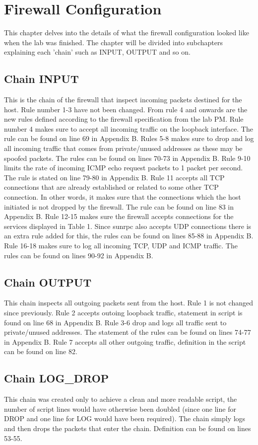 \section{Firewall Configuration}
\label{sec:config}
This chapter delves into the details of what the firewall configuration looked like when the lab was finished. The chapter will be divided into subchapters explaining each 'chain' such as INPUT, OUTPUT and so on.

\subsection{Chain INPUT}
This is the chain of the firewall that inspect incoming packets destined for the host. Rule number 1-3 have not been changed. From rule 4 and onwards are the new rules defined according to the firewall specification from the lab PM. Rule number 4 makes sure to accept all incoming traffic on the loopback interface. The rule can be found on line 69 in Appendix B. Rules 5-8 makes sure to drop and log all incoming traffic that comes from private/unused addresses as these may be spoofed packets. The rules can be found on lines 70-73 in Appendix B. Rule 9-10 limits the rate of incoming ICMP echo request packets to 1 packet per second. The rule is stated on line 79-80 in Appendix B. Rule 11 accepts all TCP connections that are already established or related to some other TCP connection. In other words, it makes sure that the connections which the host initiated is not dropped by the firewall. The rule can be found on line 83 in Appendix B. Rule 12-15 makes sure the firewall accepts connections for the services displayed in Table 1. Since sunrpc also accepts UDP connections there is an extra rule added for this, the rules can be found on lines 85-88 in Appendix B. Rule 16-18 makes sure to log all incoming TCP, UDP and ICMP traffic. The rules can be found on lines 90-92 in Appendix B.

\subsection{Chain OUTPUT}
This chain inspects all outgoing packets sent from the host. Rule 1 is not changed since previously. Rule 2 accepts outoing loopback traffic, statement in script is found on line 68 in Appendix B. Rule 3-6 drop and logs all traffic sent to private/unused addresses. The statement of the rules can be found on lines 74-77 in Appendix B. Rule 7 accepts all other outgoing traffic, definition in the script can be found on line 82.

\subsection{Chain LOG\_DROP}
This chain was created only to achieve a clean and more readable script, the number of script lines would have otherwise been doubled (since one line for DROP and one line for LOG would have been required). The chain simply logs and then drops the packets that enter the chain. Definition can be found on lines 53-55.


